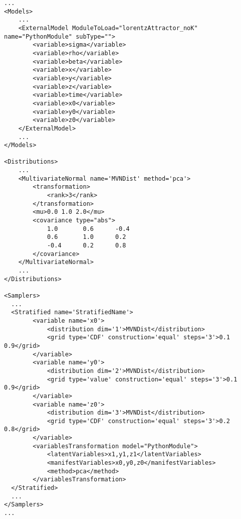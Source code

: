 \begin{lstlisting}[style=XML,morekeywords={ND,grid}]
...
<Models>
    ...
    <ExternalModel ModuleToLoad="lorentzAttractor_noK" name="PythonModule" subType="">
        <variable>sigma</variable>
        <variable>rho</variable>
        <variable>beta</variable>
        <variable>x</variable>
        <variable>y</variable>
        <variable>z</variable>
        <variable>time</variable>
        <variable>x0</variable>
        <variable>y0</variable>
        <variable>z0</variable>
    </ExternalModel>
    ...
</Models>

<Distributions>
    ...
    <MultivariateNormal name='MVNDist' method='pca'>
        <transformation>
            <rank>3</rank>
        </transformation>
        <mu>0.0 1.0 2.0</mu>
        <covariance type="abs">
            1.0       0.6      -0.4
            0.6       1.0      0.2
            -0.4      0.2      0.8
        </covariance>
    </MultivariateNormal>
    ...
</Distributions>

<Samplers>
  ...
  <Stratified name='StratifiedName'>
        <variable name='x0'>
            <distribution dim='1'>MVNDist</distribution>
            <grid type='CDF' construction='equal' steps='3'>0.1 0.9</grid>
        </variable>
        <variable name='y0'>
            <distribution dim='2'>MVNDist</distribution>
            <grid type='value' construction='equal' steps='3'>0.1 0.9</grid>
        </variable>
        <variable name='z0'>
            <distribution dim='3'>MVNDist</distribution>
            <grid type='CDF' construction='equal' steps='3'>0.2 0.8</grid>
        </variable>
        <variablesTransformation model="PythonModule">
            <latentVariables>x1,y1,z1</latentVariables>
            <manifestVariables>x0,y0,z0</manifestVariables>
            <method>pca</method>
        </variablesTransformation>
  </Stratified>
  ...
</Samplers>
...
\end{lstlisting}


